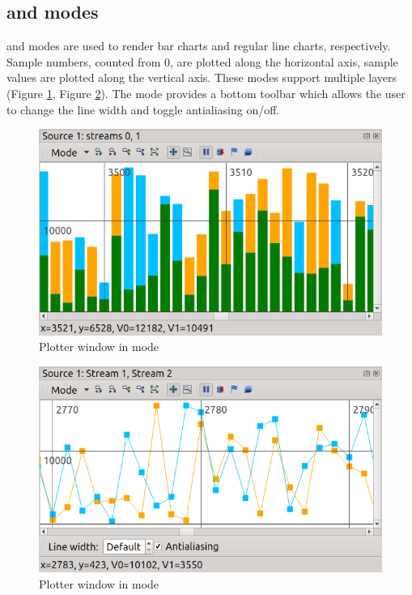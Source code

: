 \documentclass[a4paper,12pt,twoside,extrafontsizes]{memoir}
\begin{document}
\subsection{ and  modes}

 and  modes are used to render bar charts and regular line charts, respectively. Sample numbers, counted from 0, are plotted along the horizontal axis, sample values are plotted along the vertical axis. These modes support multiple layers (Figure \ref{fig:plotterbars}, Figure \ref{fig:plotterplot}). The  mode provides a bottom toolbar which allows the user to change the line width and toggle antialiasing on/off.

\begin{figure}[htbp]
\centering
\includegraphics{images/plotterbars.png}
\caption{Plotter window in  mode}
\label{fig:plotterbars}
\end{figure}

\begin{figure}[htbp]
\centering
\includegraphics{images/plotterplot.png}
\caption{Plotter window in  mode}
\label{fig:plotterplot}
\end{figure}
\end{document}
